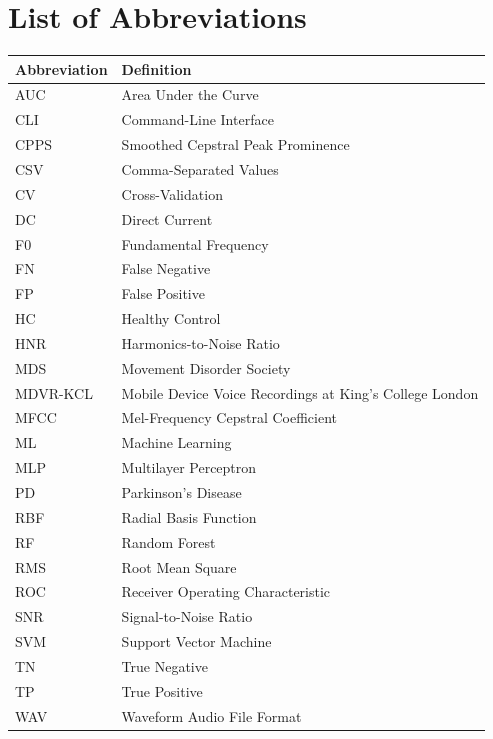 \cleardoublepage
{}
\chapter*{List of Abbreviations}

\newlength{\abbrcol}
\setlength{\abbrcol}{3.2cm}

\begin{longtable}{@{}p{\abbrcol} p{\dimexpr\textwidth-\abbrcol-2\tabcolsep\relax}@{}}
	\textbf{Abbreviation} & \textbf{Definition} \\
	\hline
	AUC & Area Under the Curve \\
	CLI & Command-Line Interface \\
	CPPS & Smoothed Cepstral Peak Prominence \\
	CSV & Comma-Separated Values \\
	CV & Cross-Validation \\
	DC & Direct Current \\
	F0 & Fundamental Frequency \\
	FN & False Negative \\
	FP & False Positive \\
	HC & Healthy Control \\
	HNR & Harmonics-to-Noise Ratio \\
	MDS & Movement Disorder Society \\
	MDVR-KCL & Mobile Device Voice Recordings at King's College London \\
	MFCC & Mel-Frequency Cepstral Coefficient \\
	ML & Machine Learning \\
	MLP & Multilayer Perceptron \\
	PD & Parkinson's Disease \\
	RBF & Radial Basis Function \\
	RF & Random Forest \\
	RMS & Root Mean Square \\
	ROC & Receiver Operating Characteristic \\
	SNR & Signal-to-Noise Ratio \\
	SVM & Support Vector Machine \\
	TN & True Negative \\
	TP & True Positive \\
	WAV & Waveform Audio File Format \\
\end{longtable}
